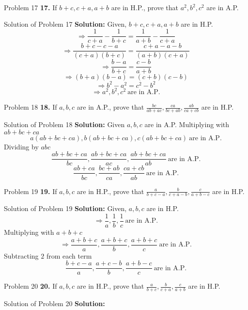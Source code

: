 \documentclass[aspectratio=1610,8pt]{beamer}
\begin{document}
\begin{frame}{Problem 17}
  \textbf{17.} If $b + c, c + a, a + b$ are in H.P., prove that $a^2, b^2, c^2$
  are in A.P.
\end{frame}
\begin{frame}{Solution of Problem 17}
  \textbf{Solution:} Given, $b + c, c + a, a + b$ are in H.P.
  $$\Rightarrow \frac{1}{c + a} - \frac{1}{b + c} = \frac{1}{a + b} -
  \frac{1}{c + a}$$
  $$\Rightarrow \frac{b + c - c - a}{(c + a)(b + c)} = \frac{c + a - a - b}{(a
    + b)(c + a)}$$
  $$\Rightarrow \frac{b - a}{b + c} = \frac{c - b}{a + b}$$
  $$\Rightarrow (b + a)(b - a) = (c + b)(c - b)$$
  $$\Rightarrow b^2 - a^2 = c^2 - b^2$$
  $$\Rightarrow a^2, b^2, c^2~\text{are in A.P.}$$
\end{frame}
\begin{frame}{Problem 18}
  \textbf{18.} If $a, b, c$ are in A.P., prove that $\frac{bc}{ab + ac},
  \frac{ca}{bc + ab}, \frac{ab}{ca + cb}$ are in H.P.
\end{frame}
\begin{frame}{Solution of Problem 18}
  \textbf{Solution:} Given $a, b, c$ are in A.P.
  Multiplying with $ab + bc + ca$
  $$a(ab + bc + ca), b(ab + bc + ca), c(ab + bc + ca)~\text{are in A.P.}$$
  Dividing by $abc$
  $$\frac{ab + bc + ca}{bc}, \frac{ab + bc + ca}{ac}, \frac{ab + bc +
    ca}{ab}~\text{are in A.P.}$$
  $$\frac{ab + ca}{bc},\frac{bc + ab}{ca}, \frac{ca + cb}{ab}~\text{are in
    A.P.}$$
\end{frame}
\begin{frame}{Problem 19}
  \textbf{19.} If $a, b, c$ are in H.P., prove that $\frac{a}{b + c - a},
  \frac{b}{c + a - b}, \frac{c}{a + b - c}$ are in H.P.
\end{frame}
\begin{frame}{Solution of Problem 19}
  \textbf{Solution:} Given, $a, b, c$ are in H.P.
  $$\Rightarrow \frac{1}{a}, \frac{1}{b}, \frac{1}{c}~\text{are in A.P.}$$
  Multiplying with $a + b + c$
  $$\Rightarrow \frac{a + b + c}{a}, \frac{a + b + c}{b}, \frac{a + b +
    c}{c}~\text{are in A.P.}$$
  Subtracting $2$ from each term
  $$\frac{b + c - a}{a}, \frac{a + c - b}{b}, \frac{a + b - c}{c}~\text{are in
    A.P.}$$
\end{frame}
\begin{frame}{Problem 20}
  \textbf{20.} If $a, b, c$ are in H.P., prove that $\frac{a}{b + c},
  \frac{b}{c + a}, \frac{c}{a + b}$ are in H.P.
\end{frame}
\begin{frame}{Solution of Problem 20}
  \textbf{Solution:}
\end{frame}
\end{document}
